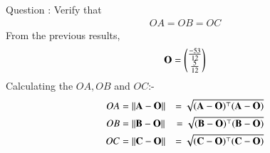 \documentclass[journal,12pt,twocolumn]{IEEEtran}
\theoremstyle{remark}
\begin{document}
%
Question : Verify that
\begin{align}
OA=OB=OC
\end{align}
\solution From the previous results,
\begin{align}
\mathbf{O}=\begin{pmatrix}\frac{-53}{12}\\ \frac{5}{12}\end{pmatrix}
\end{align}
Calculating the $OA,OB$ and $OC$:-
\begin{align}
OA&=\left\lVert\mathbf{A}-\mathbf{O}\right\rVert&=\sqrt{(\mathbf{A}-\mathbf{O})^{\top}(\mathbf{A}-\mathbf{O})}\\
OB&=\left\lVert\mathbf{B}-\mathbf{O}\right\rVert&=\sqrt{(\mathbf{B}-\mathbf{O})^{\top}(\mathbf{B}-\mathbf{O})}\\
OC&=\left\lVert\mathbf{C}-\mathbf{O}\right\rVert&=\sqrt{(\mathbf{C}-\mathbf{O})^{\top}(\mathbf{C}-\mathbf{O})}
\end{align}
\end{document}
